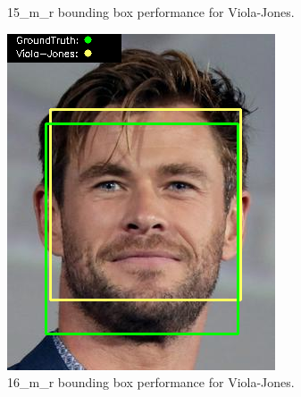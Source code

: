\documentclass{l4proj}
\begin{document}
\begin{appendices}
\begin{figure}[h!]
\begin{minipage}{0.49\textwidth}
    \caption{15\_m\_r bounding box performance for Viola-Jones.}
    \label{whoopi_result}
  \end{minipage}
\end{figure}

\begin{figure}[h!]
  \centering
  \begin{minipage}{0.49\textwidth}
    \centering
     \includegraphics[width=\textwidth]{images/appendix/viola/16.png}
    \caption{16\_m\_r bounding box performance for Viola-Jones.}
    \label{whoopi_result}
  \end{minipage}
    \hfill
    \begin{minipage}{0.49\textwidth}
    \centering

\end{minipage}
\end{figure}
\end{appendices}
\end{document}
